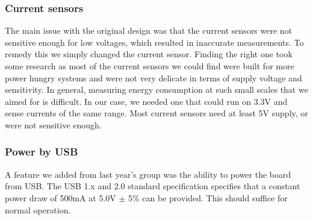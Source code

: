 \subsubsection{Current sensors}
The main issue with the original design was that the current sensors were not
sensitive enough for low voltages, which resulted in inaccurate measurements. To
remedy this we simply changed the current sensor. Finding the right one took
some research as most of the current sensors we could find were built for more
power hungry systems and were not very delicate in terms of supply voltage and
sensitivity. In general, measuring energy consumption at such small scales that
we aimed for is difficult. In our case, we needed one that could run on 3.3V and
sense currents of the same range. Most current sensors need at least 5V supply,
or were not sensitive enough.

\subsubsection{Power by USB}
A feature we added from last year's group was the ability to power the board
from USB. The USB 1.x and 2.0 standard specification specifies that a constant
power draw of 500mA at 5.0V $\pm$ 5\% can be provided.  This should suffice for normal operation.
